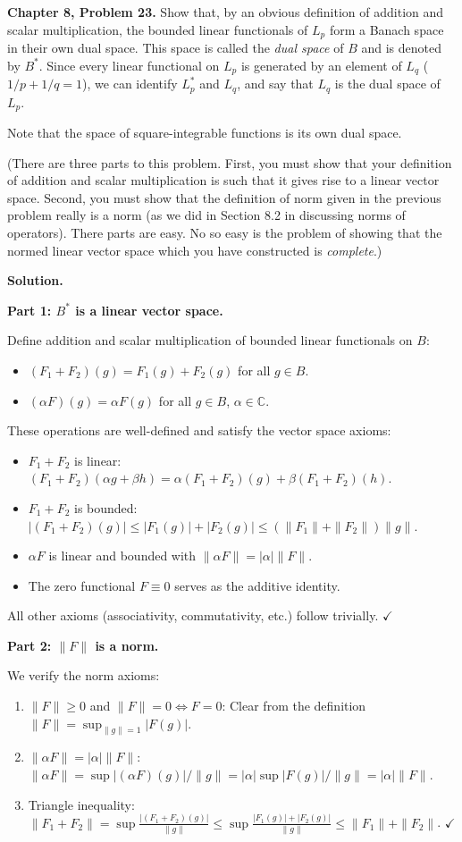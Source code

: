 \documentclass[12pt]{article}
\begin{document}
\textbf{Chapter 8, Problem 23.} Show that, by an obvious definition of addition and scalar multiplication, the bounded linear functionals of $L_p$ form a Banach space in their own dual space. This space is called the \emph{dual space} of $B$ and is denoted by $B^*$. Since every linear functional on $L_p$ is generated by an element of $L_q$ ($1/p+1/q=1$), we can identify $L_p^*$ and $L_q$, and say that $L_q$ is the dual space of $L_p$.

Note that the space of square-integrable functions is its own dual space.

(There are three parts to this problem. First, you must show that your definition of addition and scalar multiplication is such that it gives rise to a linear vector space. Second, you must show that the definition of norm given in the previous problem really is a norm (as we did in Section 8.2 in discussing norms of operators). There parts are easy. No so easy is the problem of showing that the normed linear vector space which you have constructed is \emph{complete}.)

\bigskip
\textbf{Solution.}

\textbf{Part 1: $B^*$ is a linear vector space.}

Define addition and scalar multiplication of bounded linear functionals on $B$:
\begin{itemize}
\item $(F_1+F_2)(g) = F_1(g)+F_2(g)$ for all $g\in B$.
\item $(\alpha F)(g) = \alpha F(g)$ for all $g\in B$, $\alpha\in\mathbb{C}$.
\end{itemize}

These operations are well-defined and satisfy the vector space axioms:
\begin{itemize}
\item $F_1+F_2$ is linear: $(F_1+F_2)(\alpha g+\beta h) = \alpha(F_1+F_2)(g)+\beta(F_1+F_2)(h)$.
\item $F_1+F_2$ is bounded: $|(F_1+F_2)(g)|\le|F_1(g)|+|F_2(g)|\le(\|F_1\|+\|F_2\|)\|g\|$.
\item $\alpha F$ is linear and bounded with $\|\alpha F\| = |\alpha|\|F\|$.
\item The zero functional $F\equiv 0$ serves as the additive identity.
\end{itemize}
All other axioms (associativity, commutativity, etc.) follow trivially. $\checkmark$

\textbf{Part 2: $\|F\|$ is a norm.}

We verify the norm axioms:
\begin{enumerate}
\item $\|F\|\ge 0$ and $\|F\|=0\iff F=0$: Clear from the definition $\|F\| = \sup_{\|g\|=1}|F(g)|$.
\item $\|\alpha F\| = |\alpha|\|F\|$: $\|\alpha F\| = \sup|(\alpha F)(g)|/\|g\| = |\alpha|\sup|F(g)|/\|g\| = |\alpha|\|F\|$.
\item Triangle inequality: $\|F_1+F_2\| = \sup\frac{|(F_1+F_2)(g)|}{\|g\|} \le \sup\frac{|F_1(g)|+|F_2(g)|}{\|g\|}\le \|F_1\|+\|F_2\|$. $\checkmark$
\end{enumerate}
\end{document}
